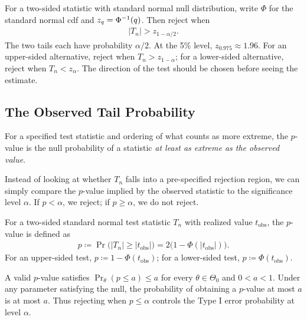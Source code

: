 \documentclass[a4paper,12pt]{article}
\begin{document}
\begin{example}
	For a two-sided statistic with standard normal null distribution,
	write $\Phi$ for the standard normal \gls{cdf} and $z_q=\Phi^{-1}(q)$.
	Then reject when
	\begin{align}\label{eq-normal-rejection}
		|T_n|>z_{1-\alpha/2}.
	\end{align}
	The two tails each have probability $\alpha/2$.
	At the 5\% level, $z_{0.975}\approx1.96$.
	For an upper-sided alternative, reject when $T_n>z_{1-\alpha}$;
	for a lower-sided alternative, reject when $T_n<z_\alpha$.
	The direction of the test should be chosen before seeing the estimate.
\end{example}

\subsection{The Observed Tail Probability}

\begin{definition}[$p$-value]
	For a specified test statistic and ordering of what counts as more extreme,
	the $p$-value is the null probability of a statistic \emph{at least as extreme as the observed value}.
\end{definition}

\begin{remark}
	Instead of looking at whether $T_n$ falls into a pre-specified rejection region,
	we can simply compare the $p$-value implied by the observed statistic to the significance level $\alpha$.
	If $p<\alpha$, we reject; if $p\ge\alpha$, we do not reject.
\end{remark}

\begin{example}
	For a two-sided standard normal test statistic $T_n$ with realized value $t_{\mathrm{obs}}$,
	the $p$-value is defined as
	\begin{align}\label{eq-normal-pvalue}
		p
		\coloneqq \Pr\big(|T_n|\ge|t_{\mathrm{obs}}|\big)
		= 2\big(1-\Phi(|t_{\mathrm{obs}}|)\big).
	\end{align}
	For an upper-sided test, $p\coloneqq1-\Phi(t_{\mathrm{obs}})$;
	for a lower-sided test, $p\coloneqq\Phi(t_{\mathrm{obs}})$.
\end{example}

\begin{remark}
	A valid $p$-value satisfies $\Pr_\theta(p\le a)\le a$ for every $\theta\in\Theta_0$ and $0<a<1$.
	Under any parameter satisfying the null, the probability of obtaining a $p$-value at most $a$ is at most $a$.
	Thus rejecting when $p\le\alpha$ controls the Type I error probability at level $\alpha$.
\end{remark}
\end{document}
